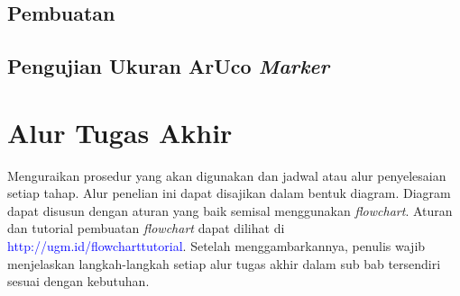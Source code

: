\subsection{Pembuatan}

\subsection{Pengujian Ukuran ArUco \emph{Marker}}

\section{Alur Tugas Akhir}

Menguraikan prosedur yang akan digunakan dan jadwal atau alur penyelesaian setiap 
tahap. Alur penelian ini dapat disajikan dalam bentuk diagram. Diagram dapat disusun dengan aturan yang baik semisal menggunakan \textit{flowchart}. Aturan dan tutorial pembuatan \textit{flowchart} dapat dilihat di \textcolor{blue}{http://ugm.id/flowcharttutorial}. Setelah menggambarkannya, penulis wajib menjelaskan langkah-langkah setiap alur tugas akhir dalam sub bab tersendiri sesuai dengan kebutuhan.
